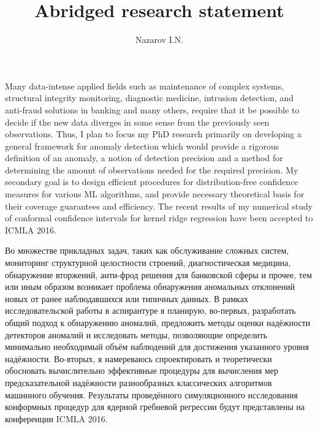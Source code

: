 \documentclass{extarticle}
\title{Abridged research statement}
\author{Nazarov I.N.}
\newcommand{\eng}[1]{\foreignlanguage{english}{#1}}
\begin{document}
\maketitle

Many data-intense applied fields such as maintenance of complex systems, structural
integrity monitoring, diagnostic medicine, intrusion detection, and anti-fraud solutions
in banking and many others, require that it be possible to decide if the new data
diverges in some sense from the previously seen observations. Thus, I plan to focus
my PhD research primarily on developing a general framework for anomaly detection
which would provide a rigorous definition of an anomaly, a notion of detection precision
and a method for determining the amount of observations needed for the required precision.
My secondary goal is to design efficient procedures for distribution-free confidence
measures for various ML algorithms, and provide necessary theoretical basis for
their coverage guarantees and efficiency. The recent results of my numerical study
of conformal confidence intervals for kernel ridge regression have been accepted
to ICMLA 2016.

Во множестве прикладных задач, таких как обслуживание сложных систем, мониторинг
структурной целостности строений, диагностическая медицина, обнаружение вторжений,
анти-фрод решения для банковской сферы и прочее, тем или иным образом возникает
проблема обнаружения аномальных отклонений новых от ранее наблюдавшихся или типичных
данных. В рамках исследовательской работы в аспирантуре я планирую, во-первых,
разработать общий подход к обнаружению аномалий, предложить методы оценки надёжности
детекторов аномалий и исследовать методы, позволяющие определить минимально необходимый
объём наблюдений для достижения указанного уровня надёжности. Во-вторых, я намереваюсь
спроектировать и теоретически обосновать вычислительно эффективные процедуры для
вычисления мер предсказательной надёжности разнообразных классических алгоритмов
машинного обучения. Результаты проведённого симуляционного исследования конформных
процедур для ядерной гребневой регрессии будут представлены на конференции \eng{ICMLA}
2016.
\end{document}
